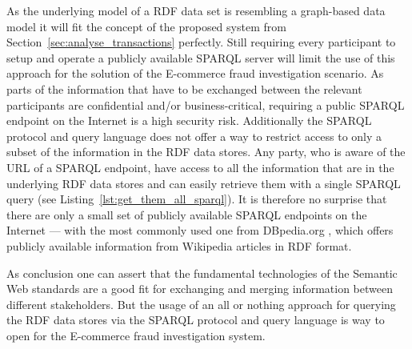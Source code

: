 As the underlying model of a \gls{RDF} data set is resembling a graph-based data model it will fit the concept of the proposed system from Section~\ref{sec:analyse_transactions} perfectly. Still requiring every participant to setup and operate a publicly available \gls{SPARQL} server will limit the use of this approach for the solution of the \gls{E-commerce} fraud investigation scenario. As parts of the information that have to be exchanged between the relevant participants are confidential and/or business-critical, requiring a public \gls{SPARQL} endpoint on the Internet is a high security risk. Additionally the \gls{SPARQL} protocol and query language does not offer a way to restrict access to only a subset of the information in the \gls{RDF} data stores. Any party, who is aware of the \gls{URL} of a \gls{SPARQL} endpoint, have access to all the information that are in the underlying \gls{RDF} data stores and can easily retrieve them with a single \gls{SPARQL} query (see Listing~\ref{lst:get_them_all_sparql}). It is therefore no surprise that there are only a small set of publicly available \gls{SPARQL} endpoints on the Internet --- with the most commonly used one from DBpedia.org \citep{dbPedia.org}, which offers publicly available information from Wikipedia articles in \gls{RDF} format. \@


As conclusion one can assert that the fundamental technologies of the Semantic Web standards are a good fit for exchanging and merging information between different stakeholders. But the usage of an all or nothing approach for querying the \gls{RDF} data stores via the \gls{SPARQL} protocol and query language is way to open for the \gls{E-commerce} fraud investigation system.


